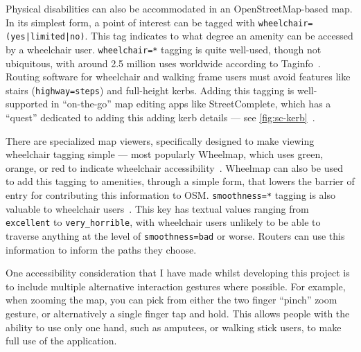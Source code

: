 \documentclass[hyphens]{final_report}
\begin{document}
Physical disabilities can also be accommodated in an OpenStreetMap-based map. In its simplest form, a point of interest can be tagged with \texttt{wheelchair=(yes|limited|no)}. This tag indicates to what degree an amenity can be accessed by a wheelchair user. \texttt{wheelchair=*} tagging is quite well-used, though not ubiquitous, with around 2.5 million uses worldwide according to Taginfo~\cite{taginfo-wheelchair}. Routing software for wheelchair and walking frame users must avoid features like stairs (\texttt{highway=steps}) and full-height kerbs. Adding this tagging is well-supported in ``on-the-go'' map editing apps like StreetComplete, which has a ``quest'' dedicated to adding this adding kerb details --- see \autoref{fig:sc-kerb}~\cite{streetcomplete}. 

There are specialized map viewers, specifically designed to make viewing wheelchair tagging simple --- most popularly Wheelmap, which uses green, orange, or red to indicate wheelchair accessibility~\cite{wheelmap}. Wheelmap can also be used to add this tagging to amenities, through a simple form, that lowers the barrier of entry for contributing this information to OSM\@. \texttt{smoothness=*} tagging is also valuable to wheelchair users~\cite{osm-wiki-smoothness}. This key has textual values ranging from \texttt{excellent} to \texttt{very\_horrible}, with wheelchair users unlikely to be able to traverse anything at the level of \texttt{smoothness=bad} or worse. Routers can use this information to inform the paths they choose.

One accessibility consideration that I have made whilst developing this project is to include multiple alternative interaction gestures where possible. For example, when zooming the map, you can pick from either the two finger ``pinch'' zoom gesture, or alternatively a single finger tap and hold. This allows people with the ability to use only one hand, such as amputees, or walking stick users, to make full use of the application.


\end{document}
